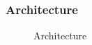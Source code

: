 \documentclass{beamer}
\begin{document}
\begin{frame}
\frametitle{Architecture}
\begin{figure}[!h]
  \centering
  \caption{\label{fig:archi}Architecture}
\end{figure}
\end{frame}
\end{document}
